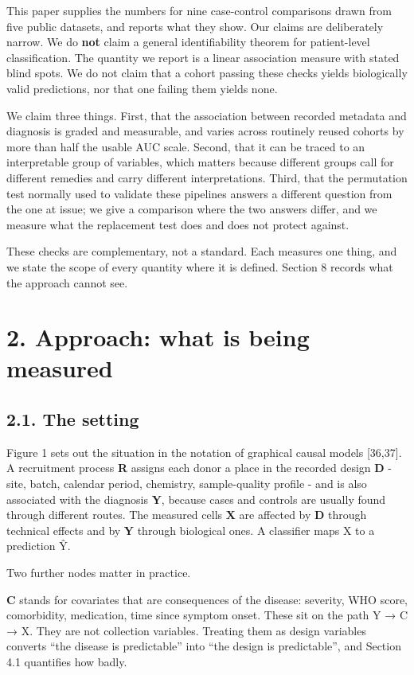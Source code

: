 This paper supplies the numbers for nine case-control comparisons drawn from five public datasets, and reports what they show. Our claims are deliberately narrow. We do \textbf{not} claim a general identifiability theorem for patient-level classification. The quantity we report is a linear association measure with stated blind spots. We do not claim that a cohort passing these checks yields biologically valid predictions, nor that one failing them yields none.

We claim three things. First, that the association between recorded metadata and diagnosis is graded and measurable, and varies across routinely reused cohorts by more than half the usable AUC scale. Second, that it can be traced to an interpretable group of variables, which matters because different groups call for different remedies and carry different interpretations. Third, that the permutation test normally used to validate these pipelines answers a different question from the one at issue; we give a comparison where the two answers differ, and we measure what the replacement test does and does not protect against.

These checks are complementary, not a standard. Each measures one thing, and we state the scope of every quantity where it is defined. Section 8 records what the approach cannot see.

\section{2. Approach: what is being measured}\label{approach-what-is-being-measured}

\subsection{2.1. The setting}\label{the-setting}

Figure 1 sets out the situation in the notation of graphical causal models {[}36,37{]}. A recruitment process \textbf{R} assigns each donor a place in the recorded design \textbf{D} - site, batch, calendar period, chemistry, sample-quality profile - and is also associated with the diagnosis \textbf{Y}, because cases and controls are usually found through different routes. The measured cells \textbf{X} are affected by \textbf{D} through technical effects and by \textbf{Y} through biological ones. A classifier maps X to a prediction Ŷ.

Two further nodes matter in practice.

\textbf{C} stands for covariates that are consequences of the disease: severity, WHO score, comorbidity, medication, time since symptom onset. These sit on the path Y → C → X. They are not collection variables. Treating them as design variables converts ``the disease is predictable'' into ``the design is predictable'', and Section 4.1 quantifies how badly.

